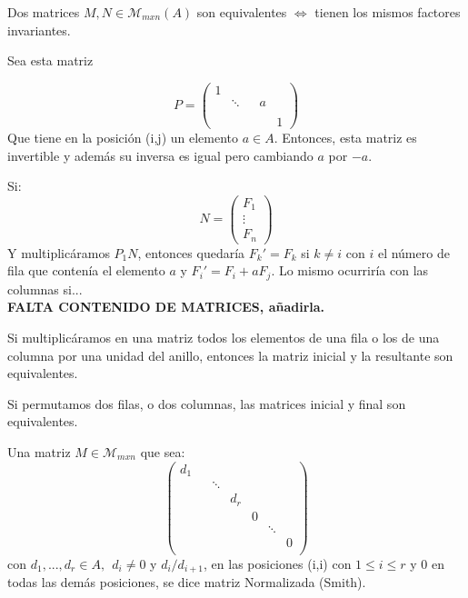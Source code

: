 \begin{ncor}
	Dos matrices $M,N \in \mathcal{M}_{mxn}(A)$ son equivalentes $\iff$ tienen los mismos factores invariantes.
\end{ncor}

Sea esta matriz

	\[P= \left( \begin{array}{ccccc}
 1&  &  & & \\
 &   \ddots & & a \\
 &  &  &  &  \\
 & & & & 1
 \end{array} \right)\]
Que tiene en la posición (i,j) un elemento $a\in A$. Entonces, esta matriz es invertible y además su inversa es igual pero cambiando $a$ por $-a$.

Si:
	\[ N =  \left( \begin{array}{c}
 F_1 \\
 \vdots\\
 F_n
 \end{array} \right)   \]
 Y multiplicáramos $P_1N$, entonces quedaría $F_k' = F_k $ si $k \ne i$ con $i$ el número de fila que contenía el elemento $a$ y $F_i'=F_i+aF_j$. Lo mismo ocurriría con las columnas si...\\
\textbf{FALTA CONTENIDO DE MATRICES, añadirla.}



\begin{nota}
	Si multiplicáramos en una matriz todos los elementos de una fila o los de una columna por una unidad del anillo, entonces la matriz inicial y la resultante son equivalentes.
\end{nota}
\begin{nota}
	Si permutamos dos filas, o dos columnas, las matrices inicial y final son equivalentes.
\end{nota}

\begin{ndef}
	Una matriz $M \in \mathcal{M}_{mxn}$ que sea:
		\[ \begin{pmatrix}
 d_{1}&  &  & & \\
 &  & \ddots &  &  \\
 & & &d_{r} &\\
 & & & & 0 \\
 & & & & & \ddots& \\
 & & & &  & & 0 \\
\end{pmatrix} \]
 con $d_1,...,d_r \in A, \ \ d_i \ne 0$ y $d_i / d_{i+1}$, en las posiciones (i,i) con $1 \leq i \leq r$ y 0 en todas las demás posiciones, se dice matriz Normalizada (Smith).
\end{ndef}

